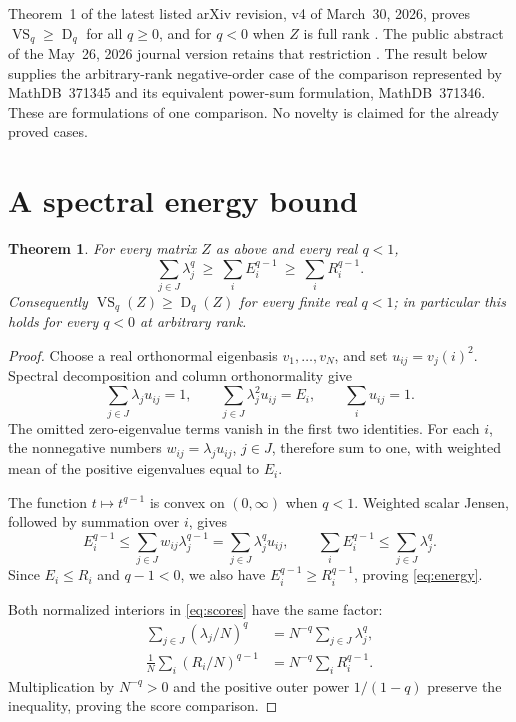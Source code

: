 \documentclass[11pt]{article}
\newtheorem{theorem}{Theorem}
\newcommand{\VS}{\operatorname{VS}}
\newcommand{\LCR}{\operatorname{D}}
\begin{document}
Theorem~1 of the latest listed arXiv revision, v4 of March~30, 2026,
proves $\VS_q\geq\LCR_q$ for all $q\geq0$, and for $q<0$ when $Z$ is
full rank \cite{NguyenPreprint}. The public abstract of the May~26, 2026
journal version retains that restriction \cite{NguyenJournal}.
The result below supplies the arbitrary-rank negative-order case of
the comparison represented by MathDB~371345 and its equivalent
power-sum formulation, MathDB~371346. These are formulations of one
comparison. No novelty is claimed for the already proved cases.

\section{A spectral energy bound}
\begin{theorem}\label{thm:energy}
For every matrix $Z$ as above and every real $q<1$,
\begin{equation}\label{eq:energy}
 \sum_{j\in J}\lambda_j^q
 \ \geq\ \sum_i E_i^{q-1}
 \ \geq\ \sum_i R_i^{q-1}.
\end{equation}
Consequently $\VS_q(Z)\geq\LCR_q(Z)$ for every finite real $q<1$;
in particular this holds for every $q<0$ at arbitrary rank.
\end{theorem}
\begin{proof}
Choose a real orthonormal eigenbasis $v_1,\ldots,v_N$, and set
$u_{ij}=v_j(i)^2$. Spectral decomposition and column orthonormality give
\begin{equation}\label{eq:frames}
 \sum_{j\in J}\lambda_j u_{ij}=1,\qquad
 \sum_{j\in J}\lambda_j^2u_{ij}=E_i,\qquad
 \sum_i u_{ij}=1.
\end{equation}
The omitted zero-eigenvalue terms vanish in the first two identities.
For each $i$, the nonnegative numbers $w_{ij}=\lambda_j u_{ij}$,
$j\in J$, therefore sum to one, with weighted mean of the positive
eigenvalues equal to $E_i$.

The function $t\mapsto t^{q-1}$ is convex on $(0,\infty)$ when $q<1$.
Weighted scalar Jensen, followed by summation over $i$, gives
\[
 E_i^{q-1}\leq\sum_{j\in J}w_{ij}\lambda_j^{q-1}
       =\sum_{j\in J}\lambda_j^q u_{ij},
 \qquad
 \sum_i E_i^{q-1}\leq\sum_{j\in J}\lambda_j^q.
\]
Since $E_i\leq R_i$ and $q-1<0$, we also have
$E_i^{q-1}\geq R_i^{q-1}$, proving \eqref{eq:energy}.

Both normalized interiors in \eqref{eq:scores} have the same factor:
\begin{align*}
 \sum_{j\in J}(\lambda_j/N)^q
     &=N^{-q}\sum_{j\in J}\lambda_j^q,\\
 \frac1N\sum_i(R_i/N)^{q-1}
     &=N^{-q}\sum_i R_i^{q-1}.
\end{align*}
Multiplication by $N^{-q}>0$ and the positive outer power $1/(1-q)$
preserve the inequality, proving the score comparison.
\end{proof}
\end{document}
